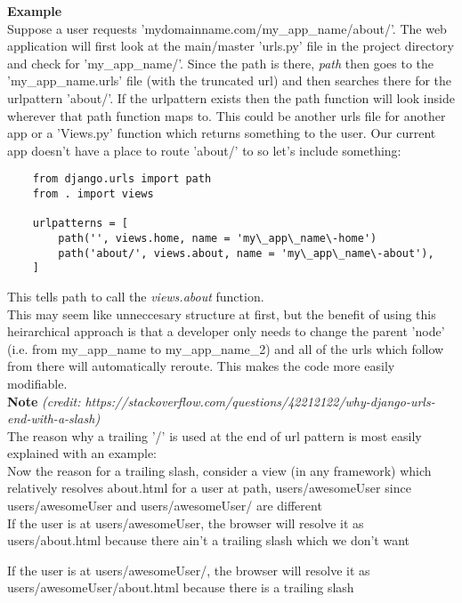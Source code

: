 \documentclass{article}%
\begin{document}
\textbf{Example}\\ Suppose a user requests 'mydomainname.com/my\_app\_name/about/'. The web application will first look at the main/master 'urls.py' file in the project directory and check for 'my\_app\_name/'. Since the path is there, \textit{path} then goes to the 'my\_app\_name.urls' file (with the truncated url) and then
searches there for the urlpattern 'about/'. If the urlpattern exists then the path function will look inside wherever that path function maps to. This could be another urls file for another app or a 'Views.py' function which returns something to the user. Our current app doesn't have a place to route 'about/' to so let's include something:
\begin{lstlisting}
    from django.urls import path
    from . import views

    urlpatterns = [
        path('', views.home, name = 'my\_app\_name\-home')
        path('about/', views.about, name = 'my\_app\_name\-about'),
    ]
\end{lstlisting}
This tells path to call the \textit{views.about} function. \\

This may seem like unneccesary structure at first, but the benefit of using this heirarchical approach is that a developer only needs to change the parent 'node' (i.e. from my\_app\_name to my\_app\_name\_2) and all of the urls which follow from there will automatically reroute. This makes the code more easily modifiable. \\

\textbf{Note} \textit{(credit: https://stackoverflow.com/questions/42212122/why-django-urls-end-with-a-slash)} \\ 

\noindent The reason why a trailing '/' is used at the end of url pattern is most easily explained with an example: \\

\noindent Now the reason for a trailing slash, consider a view (in any framework) which relatively resolves about.html for a user at path, users/awesomeUser
since users/awesomeUser and users/awesomeUser/ are different \\ 

\noindent If the user is at users/awesomeUser, the browser will resolve it as users/about.html because there ain't a trailing slash which we don't want

\noindent If the user is at users/awesomeUser/, the browser will resolve it as users/awesomeUser/about.html because there is a trailing slash \\ \\
\end{document}
